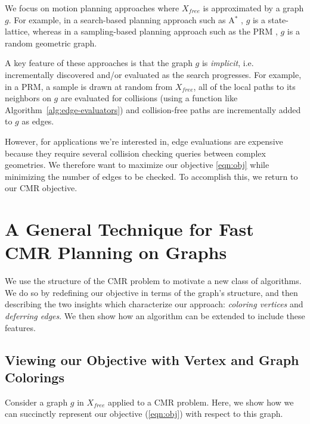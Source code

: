 \documentclass{report}
\begin{document}
We focus on motion planning approaches where
$X_{free}$ is approximated by a graph $g$.
For example,
in a search-based planning approach such as A$^*$ \cite{hart1968astar},
$g$ is a state-lattice,
whereas in a sampling-based planning approach such as the
PRM \cite{kavrakietal1996prm},
$g$ is a random geometric graph.

A key feature of these approaches is that the graph $g$ is \emph{implicit},
i.e. incrementally discovered and/or evaluated as the search progresses.
For example, in a PRM, a sample is drawn at random from $X_{free}$,
all of the local paths to its neighbors on $g$
are evaluated for collisions (using a function
like Algorithm~\ref{alg:edge-evaluators})
and collision-free paths are incrementally added to $g$ as edges.

However, for applications we're interested in,
edge evaluations are expensive \cite{lavalle2006planningbook}
because they require several collision checking queries between
complex geometries.
We therefore want to maximize our objective \eqref{eqn:obj}
while minimizing the number of edges to be checked.
To accomplish this, we return to our CMR objective.

\section{A General Technique for Fast\\CMR Planning on Graphs}
\label{sec:gen-sol}

We use the structure of the CMR problem
to motivate a new class of algorithms.
We do so by redefining our objective in terms of the graph's structure,
and then describing the two insights which characterize our approach:
\emph{coloring vertices} and \emph{deferring edges}.
We then show how an algorithm can be extended to include these features.

\subsection{Viewing our Objective with Vertex and Graph Colorings}

Consider a graph $g$ in $X_{free}$
applied to a CMR problem.
Here, we show how we can succinctly represent our objective
(\ref{eqn:obj}) with respect to this graph.
\end{document}
